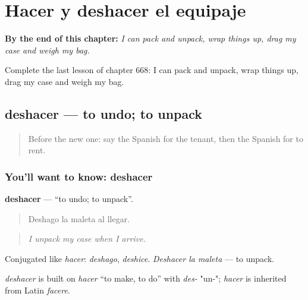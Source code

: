 
\chapter{Hacer y deshacer el equipaje}
\label{ch:es-hacer-y-deshacer-el-equipaje}

\begin{chapteropening}
\textbf{By the end of this chapter:} \emph{I can pack and unpack, wrap things up, drag my case and weigh my bag.}

Complete the last lesson of chapter 668: I can pack and unpack, wrap things up, drag my case and weigh my bag.
\end{chapteropening}

\section[deshacer]{deshacer — to undo; to unpack}

\label{lesson:ES-C668-deshacer}



\begin{quote}
Before the new one: say the Spanish for the tenant, then the Spanish for to rent.
\end{quote}

\subsection*{You'll want to know: deshacer}
\textbf{deshacer} — \textquotedblleft{}to undo; to unpack\textquotedblright{}.

\begin{quote}
Deshago la maleta al llegar.
\end{quote}

\begin{quote}
\emph{I unpack my case when I arrive.}
\end{quote}

Conjugated like \emph{hacer}: \emph{deshago}, \emph{deshice}. \emph{Deshacer la maleta} — to unpack.

\begin{cousinweb}
\emph{deshacer} is built on \emph{hacer} \textquotedblleft{}to make, to do\textquotedblright{} with \emph{des-} "un-"; \emph{hacer} is inherited from Latin \emph{facere}.
\end{cousinweb}

